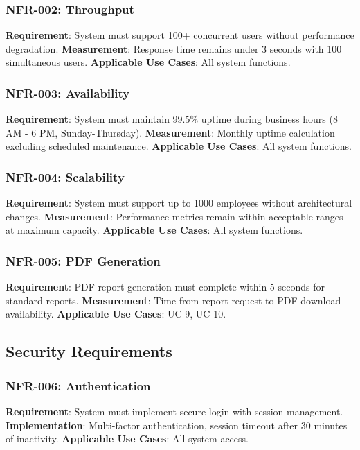 \documentclass[12pt,a4paper]{article}
\begin{document}
\subsubsection{NFR-002: Throughput}
\textbf{Requirement}: System must support 100+ concurrent users without performance degradation.
\textbf{Measurement}: Response time remains under 3 seconds with 100 simultaneous users.
\textbf{Applicable Use Cases}: All system functions.

\subsubsection{NFR-003: Availability}
\textbf{Requirement}: System must maintain 99.5\% uptime during business hours (8 AM - 6 PM, Sunday-Thursday).
\textbf{Measurement}: Monthly uptime calculation excluding scheduled maintenance.
\textbf{Applicable Use Cases}: All system functions.

\subsubsection{NFR-004: Scalability}
\textbf{Requirement}: System must support up to 1000 employees without architectural changes.
\textbf{Measurement}: Performance metrics remain within acceptable ranges at maximum capacity.
\textbf{Applicable Use Cases}: All system functions.

\subsubsection{NFR-005: PDF Generation}
\textbf{Requirement}: PDF report generation must complete within 5 seconds for standard reports.
\textbf{Measurement}: Time from report request to PDF download availability.
\textbf{Applicable Use Cases}: UC-9, UC-10.

\subsection{Security Requirements}

\subsubsection{NFR-006: Authentication}
\textbf{Requirement}: System must implement secure login with session management.
\textbf{Implementation}: Multi-factor authentication, session timeout after 30 minutes of inactivity.
\textbf{Applicable Use Cases}: All system access.
\end{document}
